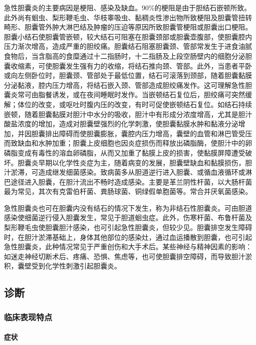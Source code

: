 急性胆囊炎的主要病因是梗阻、感染及缺血。90\%的梗阻是由于胆结石嵌顿所致。此外尚有蛔虫、梨形鞭毛虫、华枝睾吸虫、黏稠炎性渗出物所致梗阻及胆囊管扭转畸形、胆囊管外肿大淋巴结及肿瘤的压迫等原因所致胆囊管梗阻或胆囊出口梗阻。胆囊小结石使胆囊管嵌顿，较大结石可阻塞在胆囊颈部或胆囊壶腹部，使胆囊腔内压力渐次增高，造成严重的胆绞痛。胆囊结石阻塞胆囊颈、管部常发生于进食油腻食物后，当含脂高的食糜通过十二指肠时，十二指肠及上段空肠壁内的细胞分泌胆囊收缩素，可使胆囊发生强有力的收缩，将结石推向颈、管部。此外，当患者平卧或向左侧卧位时，胆囊颈、管部处于最低位置，结石可滚落到颈部，随着胆囊黏膜分泌黏液，腔内压力增高，将结石嵌入颈、管部造成胆绞痛发作。这可理解急性胆囊炎常可由脂餐诱发，或在夜间睡眠时发作。当嵌顿结石复位后，胆绞痛可突然缓解；体位的改变，或呕吐时腹内压的改变，有时可促使嵌顿结石复位。如结石持续嵌顿，随着胆囊黏膜对胆汁中水分的吸收，胆汁中有形成分浓度增高，尤其是胆汁酸盐浓度的增加，造成对胆囊壁强烈的化学刺激，使胆囊黏膜水肿和黏液分泌增加，并因胆囊排出障碍而使胆囊膨胀，囊腔内压力增高，囊壁的血管和淋巴管受压而致缺血和水肿加重；胆囊上皮细胞也因炎症损伤而释放出磷脂酶，使胆汁中的卵磷脂变成有毒性的溶血卵磷脂，从而又加重了黏膜上皮的损害，使黏膜屏障遭受破坏。胆囊炎早期以化学性炎症为主，随着病变的发展，胆囊壁缺血和黏膜损伤，胆汁淤滞，可造成继发细菌感染。致病菌多从胆道逆行进入胆囊、或循血液循环或淋巴途径进入胆囊，在胆汁流出不畅时造成感染。主要是革兰阴性杆菌，以大肠杆菌最为常见，其次有克雷伯杆菌、粪肠球菌、铜绿假单胞菌等。常合并厌氧菌感染。

急性胆囊炎也可在胆囊内没有结石的情况下发生，称为非结石性胆囊炎。可由胆道感染使细菌逆行侵入胆囊发生，常见于胆道蛔虫症。此外，伤寒杆菌、布鲁杆菌及梨形鞭毛虫使胆囊胆汁感染，也可引起急性胆囊炎，但较少见。胆囊排空发生障碍时，在胆汁淤滞基础上，身体其他部位的感染灶，通过血运播散到胆囊，也可引起急性胆囊炎，此种情况常见于严重创伤和大手术后。某些神经与精神因素的影响：如迷走神经切断术后、疼痛、恐惧、焦虑等，也可使胆囊排空障碍，而导致胆汁淤积，囊壁受到化学性刺激引起胆囊炎。

\subsection{诊断}

\subsubsection{临床表现特点}

\paragraph{症状}

